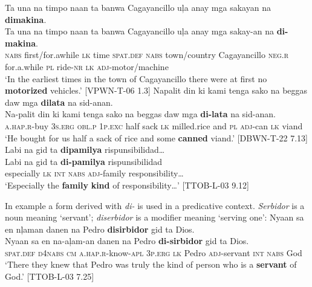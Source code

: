 \ea
\label{bkm:Ref481478039}
Ta  una  na  timpo  naan  ta  banwa  Cagayancillo  uļa anay  mga  sakayan  na  \textbf{dimakina}. \\\smallskip
 \gll Ta  una  na  timpo  naan  ta  banwa  Cagayancillo  uļa anay  mga  sakay-an  na  \textbf{di-makina}. \\
\textsc{nabs}  first/for.awhile  \textsc{lk}  time  \textsc{spat.def}  \textsc{nabs}  town/country  Cagayancillo  \textsc{neg.r} for.a.while \textsc{pl} ride-\textsc{nr}  \textsc{lk}  \textsc{adj}-motor/machine \\
\glt `In the earliest times in the town of Cagayancillo there were at first no \textbf{motorized} vehicles.’ [VPWN-T-06 1.3]
\z
\ea
Napalit  din  ki  kami  tenga  sako  na  beggas daw  mga  \textbf{dilata}  na  sid-anan. \\\smallskip
 \gll Na-palit  din  ki  kami  tenga  sako  na  beggas daw  mga  \textbf{di-lata}  na  sid-anan. \\
\textsc{a.hap.r}-buy  3\textsc{s.erg}  \textsc{obl.p}  1\textsc{p.exc}  half  sack  \textsc{lk}  milled.rice
and  \textsc{pl} \textsc{adj}-can  \textsc{lk}  viand\footnotemark \\
\glt `He bought for us half a sack of rice and some \textbf{canned} viand.’ [DBWN-T-22 7.13]
\z
\ea
\label{bkm:Ref481478100}
Labi  na  gid  ta  \textbf{dipamilya}  rispunsibilidad… \\\smallskip
 \gll Labi  na  gid  ta  \textbf{di-pamilya}  rispunsibilidad \\
especially  \textsc{lk}  \textsc{int}  \textsc{nabs}  \textsc{adj}-family  responsibility… \\
\glt ‘Especially the \textbf{family} \textbf{kind} of responsibility…' [TTOB-L-03 9.12]
\z

In example  a form derived with \textit{di-} is used in a predicative context. \textit{Serbidor} is a noun meaning ‘servant’; \textit{diserbidor} is a modifier meaning ‘serving one’:
\ea
\label{bkm:Ref117583999}
Nyaan  sa  en  nļaman  danen  na  Pedro \textbf{disirbidor} gid  ta  Dios. \\\smallskip
 \gll Nyaan  sa  en  na-aļam-an  danen  na  Pedro \textbf{di-sirbidor} gid  ta  Dios. \\
\textsc{spat.def}  \textsc{d4nabs}  \textsc{cm}  \textsc{a.hap.r-}know-\textsc{apl}  3\textsc{p.erg}  \textsc{lk}  Pedro \textsc{adj}-servant \textsc{int}  \textsc{nabs}  God \\
\glt`There they knew that Pedro was truly the kind of person who is a \textbf{servant} of God.’ [TTOB-L-03 7.25]
\z

